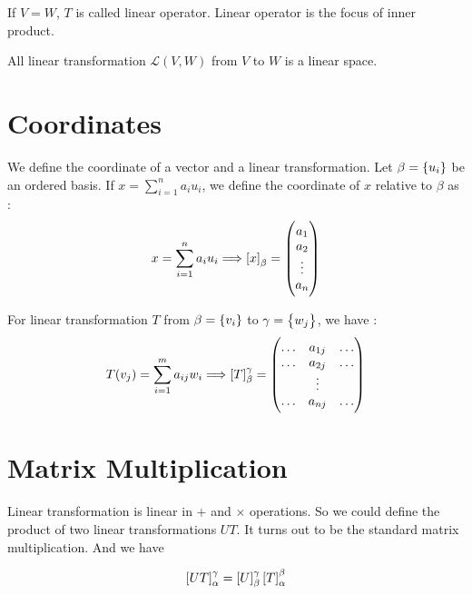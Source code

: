 If $V = W$, $T$ is called linear operator. Linear operator is the focus of inner product.

All linear transformation $\mathcal {L}(V,W)$ from $V$ to $W$ is a linear space.

\section{Coordinates}

We define the coordinate of a vector and a linear transformation. Let $\beta = \set{u_i}$ be an ordered basis. If $x = \sum_{i=1}^n a_i u_i$, we define the coordinate of $x$ relative to $\beta$ as :
\begin{equation}
    x = \sum_{i=1}^n a_i u_i \Longrightarrow \coordinate{x}_\beta = \begin{pmatrix}
        a_1 \\
        a_2 \\
        \vdots \\
        a_n
    \end{pmatrix}
\end{equation}

For linear transformation $T$ from $\beta = \set{v_i} $ to $\gamma = \set{w_j}$, we have :
\begin{equation}
    T(v_j) = \sum_{i=1}^m a_{ij} w_i \Longrightarrow \coordinate{T}_{\beta}^{\gamma} = \begin{pmatrix}
        \hdots & a_{1j} & \hdots \\
        \hdots & a_{2j} & \hdots \\
        & \vdots \\
        \hdots & a_{nj} & \hdots \\
    \end{pmatrix}
\end{equation}



\section{Matrix Multiplication}

Linear transformation is linear in $+$ and $\times$ operations. So we could define the product of two linear transformations $UT$. It turns out to be the standard matrix multiplication. And we have

\begin{equation}\label{matrix_coordinate}
    \coordinate{UT}_{\alpha}^{\gamma} = \coordinate{U}_{\beta}^{\gamma} \coordinate{T}_{\alpha}^{\beta}
\end{equation}

